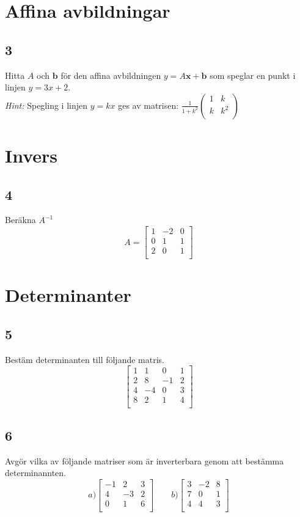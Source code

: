 \documentclass{article}
\begin{document}
\section*{Affina avbildningar}
\subsection*{3}
Hitta $A$ och $\mathbf{b}$ för den affina avbildningen $y = A\mathbf{x} + \mathbf{b}$ som 
speglar en punkt i linjen $y = 3x + 2$.
\\
\textit{Hint: }
Spegling i linjen $y = kx$ ges av matrisen: 
$
\frac{1}{1+k^2}
\begin{pmatrix}
	1	&	k \\
	k	&	k^2 \\
\end{pmatrix}
$

\section*{Invers}
\subsection*{4}
Beräkna $A^{-1}$
$$ A =
\begin{bmatrix}
    1 & -2 & 0 \\
    0 &  1 & 1 \\
    2 &  0 & 1 \\
\end{bmatrix}
$$
\section*{Determinanter}
\subsection*{5}
Bestäm determinanten till följande matris.
$$
\begin{bmatrix}
    1  & 1   &  0   &  1 \\
    2  & 8   &  -1  &  2  \\
    4  & -4  &  0   &  3   \\
    8  &  2  &  1   &  4   \\
\end{bmatrix}
$$

\subsection*{6}
Avgör vilka av följande matriser som är inverterbara genom att bestämma 
determinannten.
$$
a)
\begin{bmatrix}
    -1 & 2 & 3 \\
     4 &-3 & 2 \\
     0 & 1 & 6 \\
\end{bmatrix}
\qquad
b)
\begin{bmatrix}
    3 & -2 & 8 \\
    7 &  0 & 1 \\
    4 &  4 & 3 \\
\end{bmatrix}
$$
\end{document}
